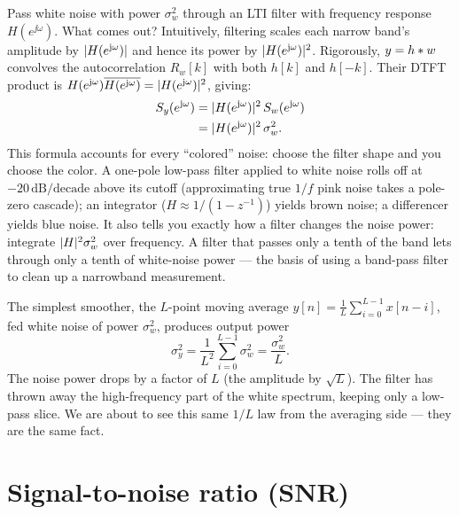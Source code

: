 Pass white noise with power $\sigma_w^2$ through an LTI filter with frequency
response $H(e^{\jj\omega})$. What comes out? Intuitively, filtering scales each narrow band's amplitude by $\lvert H(e^{\mathrm{j}\omega})\rvert$ and hence its power by $\lvert H(e^{\mathrm{j}\omega})\rvert^2$. Rigorously, $y = h \ast w$ convolves the autocorrelation $R_w[k]$ with both $h[k]$ and $h[-k]$. Their DTFT product is $H(e^{\mathrm{j}\omega})\overline{H(e^{\mathrm{j}\omega})} = \lvert H(e^{\mathrm{j}\omega})\rvert^2$, giving:
\begin{align}
  S_y(e^{\mathrm{j}\omega}) &= \lvert H(e^{\mathrm{j}\omega})\rvert^2\, S_w(e^{\mathrm{j}\omega}) \nonumber \\
  &= \lvert H(e^{\mathrm{j}\omega})\rvert^2\,\sigma_w^2.
  \label{ch20:filtered-psd}
\end{align}
This formula accounts for every ``colored'' noise: choose the
filter shape and you choose the color. A one-pole low-pass filter applied to
white noise rolls off at $-20\,\text{dB/decade}$ above its cutoff (approximating true $1/f$ pink noise takes a pole-zero cascade); an integrator ($H \approx 1/(1-z^{-1})$)
yields brown noise; a differencer yields blue noise. It also tells you exactly
how a filter changes the noise power: integrate $\lvert H\rvert^2\sigma_w^2$ over
frequency. A filter that passes only a tenth of the band lets through only a
tenth of white-noise power --- the basis of using a band-pass filter to clean up a
narrowband measurement.

\begin{example}
\label{ch20:ex-ma-noise}
The simplest smoother, the $L$-point moving average $y[n]=\frac1L\sum_{i=0}^{L-1}x[n-i]$,
fed white noise of power $\sigma_w^2$, produces output power
\[
  \sigma_y^2 = \frac{1}{L^2}\sum_{i=0}^{L-1}\sigma_w^2 = \frac{\sigma_w^2}{L}.
\]
The noise power drops by a factor of $L$ (the amplitude by $\sqrt L$). The
filter has thrown away the high-frequency part of the white spectrum, keeping
only a low-pass slice. We are about to see this same $1/L$ law from the averaging
side --- they are the same fact.
\end{example}

\section{Signal-to-noise ratio (SNR)}
\label{ch20:snr}

